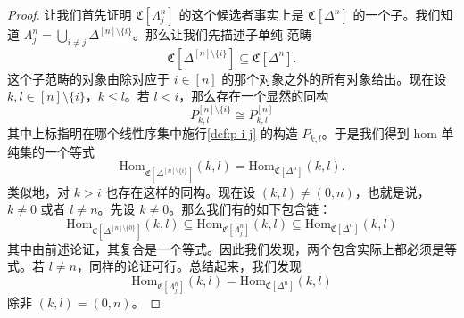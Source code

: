 \begin{proof}
让我们首先证明 $\mathfrak{C}[\Lambda^n_j]$ 的这个候选者事实上是
$\mathfrak{C}[\Delta^n]$ 的一个子\trSimplicialCategory{}。我们知道
$\Lambda^n_j = \bigcup_{i \ne j} \Delta^{[n]\setminus\{i\}}$。那么让我们先描述子单纯
范畴
\[
\mathfrak{C}[\Delta^{[n]\setminus\{i\}}] \subseteq \mathfrak{C}[\Delta^n].
\]
这个子范畴的对象由除对应于 $i \in [n]$ 的那个对象之外的所有对象给出。现在设
$k, l \in [n]\setminus\{i\}$，$k \le l$。若 $l < i$，那么存在一个显然的同构
\[
P^{[n]\setminus\{i\}}_{k,l} \cong P^{[n]}_{k,l}
\]
其中上标指明在哪个线性序集中施行\cref{def:p-i-j} 的构造 $P_{k,l}$。于是我们得到
hom-单纯集的一个等式
\[
\mathrm{Hom}_{\mathfrak{C}[\Delta^{[n]\setminus\{i\}}]}(k, l) =
\mathrm{Hom}_{\mathfrak{C}[\Delta^n]}(k, l).
\]
类似地，对 $k > i$ 也存在这样的同构。现在设 $(k, l) \ne (0, n)$，也就是说，$k \ne 0$
或者 $l \ne n$。先设 $k \ne 0$。那么我们有\trSimplicialSet{}的如下包含链：
\[
\mathrm{Hom}_{\mathfrak{C}[\Delta^{[n]\setminus\{0\}}]}(k, l) \subseteq
\mathrm{Hom}_{\mathfrak{C}[\Lambda^n_j]}(k, l) \subseteq
\mathrm{Hom}_{\mathfrak{C}[\Delta^n]}(k, l)
\]
其中由前述论证，其复合是一个等式。因此我们发现，两个包含实际上都必须是等式。若
$l \ne n$，同样的论证可行。总结起来，我们发现
\[
\mathrm{Hom}_{\mathfrak{C}[\Lambda^n_j]}(k, l) =
\mathrm{Hom}_{\mathfrak{C}[\Delta^n]}(k, l)
\]
除非 $(k, l) = (0, n)$。


\end{proof}
